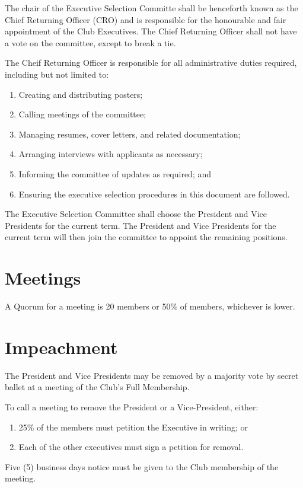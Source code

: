 \documentclass[11pt]{mathsoc}
\begin{document}
The chair of the Executive Selection Committe shall be henceforth known as the
Chief Returning Officer (CRO) and is responsible for the honourable and fair
appointment of the Club Executives. The Chief Returning Officer shall not have
a vote on the committee, except to break a tie. 

The Cheif Returning Officer is responsible for all administrative duties 
required, including but not limited to:
\begin{enumerate}
    \item Creating and distributing posters;
    \item Calling meetings of the committee;
    \item Managing resumes, cover letters, and related documentation;
    \item Arranging interviews with applicants as necessary;
    \item Informing the committee of updates as required; and
    \item Ensuring the executive selection procedures in this document are 
        followed.
\end{enumerate}

The Executive Selection Committee shall choose the President and Vice 
Presidents for the current term. The President and Vice Presidents for the 
current term will then join the committee to appoint the remaining positions.

\section{Meetings}
A Quorum for a meeting is 20 members or 50\% of members, whichever is lower.

\section{Impeachment}
The President and Vice Presidents may be removed by a majority vote by 
secret ballet at a meeting of the Club's Full Membership.

To call a meeting to remove the President or a Vice-President, either:
\begin{enumerate}
    \item 25\% of the members must petition the Executive in writing; or
    \item Each of the other executives must sign a petition for removal. 
\end{enumerate}

Five (5) business days notice must be given to the Club membership of the
meeting. 
\end{document}
